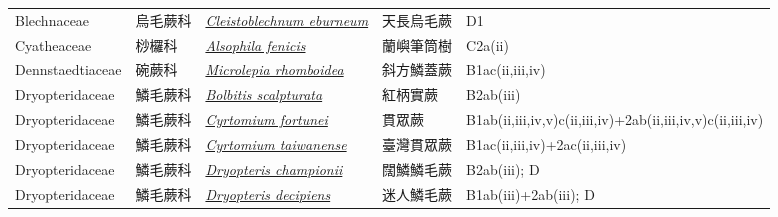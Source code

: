 {\begin{longtable}{L{2.5cm}L{2cm}L{5cm}L{2.5cm}L{3cm}}
    Blechnaceae & 烏毛蕨科 & \href{http://www.theplantlist.org/tpl1.1/search?q=Cleistoblechnum+eburneum}{\textit{Cleistoblechnum eburneum} } & 天長烏毛蕨 & D1    \\
    Cyatheaceae & 桫欏科 & \href{http://www.theplantlist.org/tpl1.1/search?q=Alsophila+fenicis}{\textit{Alsophila fenicis} } & 蘭嶼筆筒樹 & C2a(ii)    \\
    Dennstaedtiaceae & 碗蕨科 & \href{http://www.theplantlist.org/tpl1.1/search?q=Microlepia+rhomboidea}{\textit{Microlepia rhomboidea} } & 斜方鱗蓋蕨 & B1ac(ii,iii,iv)    \\
    Dryopteridaceae & 鱗毛蕨科 & \href{http://www.theplantlist.org/tpl1.1/search?q=Bolbitis+scalpturata}{\textit{Bolbitis scalpturata} } & 紅柄實蕨 & B2ab(iii)    \\
    Dryopteridaceae & 鱗毛蕨科 & \href{http://www.theplantlist.org/tpl1.1/search?q=Cyrtomium+fortunei}{\textit{Cyrtomium fortunei} } & 貫眾蕨 & B1ab(ii,iii,iv,v)c(ii,iii,iv)+2ab(ii,iii,iv,v)c(ii,iii,iv)    \\
    Dryopteridaceae & 鱗毛蕨科 & \href{http://www.theplantlist.org/tpl1.1/search?q=Cyrtomium+taiwanense}{\textit{Cyrtomium taiwanense} } & 臺灣貫眾蕨 & B1ac(ii,iii,iv)+2ac(ii,iii,iv)    \\
    Dryopteridaceae & 鱗毛蕨科 & \href{http://www.theplantlist.org/tpl1.1/search?q=Dryopteris+championii}{\textit{Dryopteris championii} } & 闊鱗鱗毛蕨 & B2ab(iii); D    \\
    Dryopteridaceae & 鱗毛蕨科 & \href{http://www.theplantlist.org/tpl1.1/search?q=Dryopteris+decipiens}{\textit{Dryopteris decipiens} } & 迷人鱗毛蕨 & B1ab(iii)+2ab(iii); D    \\

\end{longtable}}
